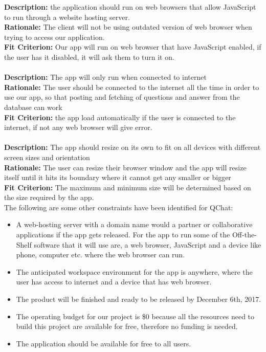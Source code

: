 \documentclass[12pt, titlepage]{article}
\begin{document}
\textbf{Description:} the application should run on web browsers that allow JavaScript to run through a website hosting server.
\\
\textbf{Rationale:} The client will not be using outdated version of web browser when trying to access our application. 
\\
\textbf{Fit Criterion:} Our app will run on web browser that have JavaScript enabled, if the user has it disabled, it will ask them to turn it on. 
\\
\\
\textbf{Description:} The app will only run when connected to internet
\\
\textbf{Rationale:} The user should be connected to the internet all the time in order to use our app, so that posting and fetching of questions and answer from the database can work
\\
\textbf{Fit Criterion:} the app load automatically if the user is connected to the internet, if not any web browser will give error.
\\
\\
\textbf{Description:} The app should resize on its own to fit on all devices with different screen sizes and orientation 
\\
\textbf{Rationale:} The user can resize their browser window and the app will resize itself until it hits its boundary where it cannot get any smaller or bigger
\\
\textbf{Fit Criterion:} The maximum and minimum size will be determined based on the size required by the app.
\\

The following are some other constraints have been identified for QChat: 

\begin{itemize}
  \item A web-hosting server with a domain name would a partner or collaborative applications if the app gets released. 
For the app to run some of the Off-the-Shelf software that it will use are, a web browser, JavaScript and a device like phone, computer etc. where the web browser can run.
  \item The anticipated workspace environment for the app is anywhere, where the user has access to internet and a device that has web browser.
  \item The product will be finished and ready to be released by December 6th, 2017.
  \item The operating budget for our project is \$0 because all the resources need to build this project are available for free, therefore no funding is needed.
  \item The application should be available for free to all users.
\end{itemize}
\end{document}
